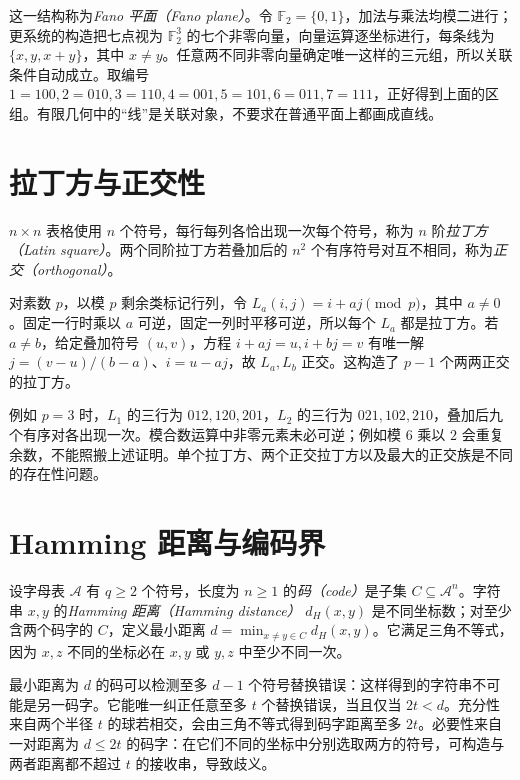 这一结构称为\emph{Fano 平面（Fano plane）}。令 $\mathbb F_2=\{0,1\}$，加法与乘法均模二进行；更系统的构造把七点视为 $\mathbb F_2^3$ 的七个非零向量，向量运算逐坐标进行，每条线为 $\{x,y,x+y\}$，其中 $x\ne y$。任意两不同非零向量确定唯一这样的三元组，所以关联条件自动成立。取编号 $1=100,2=010,3=110,4=001,5=101,6=011,7=111$，正好得到上面的区组。有限几何中的“线”是关联对象，不要求在普通平面上都画成直线。

\section{拉丁方与正交性}

\begin{definition}
$n\times n$ 表格使用 $n$ 个符号，每行每列各恰出现一次每个符号，称为 $n$ 阶\emph{拉丁方（Latin square）}。两个同阶拉丁方若叠加后的 $n^2$ 个有序符号对互不相同，称为\emph{正交（orthogonal）}。
\end{definition}

对素数 $p$，以模 $p$ 剩余类标记行列，令 $L_a(i,j)=i+aj\pmod p$，其中 $a\ne0$。固定一行时乘以 $a$ 可逆，固定一列时平移可逆，所以每个 $L_a$ 都是拉丁方。若 $a\ne b$，给定叠加符号 $(u,v)$，方程 $i+aj=u,i+bj=v$ 有唯一解 $j=(v-u)/(b-a)$、$i=u-aj$，故 $L_a,L_b$ 正交。这构造了 $p-1$ 个两两正交的拉丁方。

例如 $p=3$ 时，$L_1$ 的三行为 $012,120,201$，$L_2$ 的三行为 $021,102,210$，叠加后九个有序对各出现一次。模合数运算中非零元素未必可逆；例如模 $6$ 乘以 $2$ 会重复余数，不能照搬上述证明。单个拉丁方、两个正交拉丁方以及最大的正交族是不同的存在性问题。

\section{Hamming 距离与编码界}

设字母表 $\mathcal A$ 有 $q\ge2$ 个符号，长度为 $n\ge1$ 的\emph{码（code）}是子集 $C\subseteq\mathcal A^n$。字符串 $x,y$ 的\emph{Hamming 距离（Hamming distance）} $d_H(x,y)$ 是不同坐标数；对至少含两个码字的 $C$，定义最小距离 $d=\min_{x\ne y\in C}d_H(x,y)$。它满足三角不等式，因为 $x,z$ 不同的坐标必在 $x,y$ 或 $y,z$ 中至少不同一次。

最小距离为 $d$ 的码可以检测至多 $d-1$ 个符号替换错误：这样得到的字符串不可能是另一码字。它能唯一纠正任意至多 $t$ 个替换错误，当且仅当 $2t<d$。充分性来自两个半径 $t$ 的球若相交，会由三角不等式得到码字距离至多 $2t$。必要性来自一对距离为 $d\le2t$ 的码字：在它们不同的坐标中分别选取两方的符号，可构造与两者距离都不超过 $t$ 的接收串，导致歧义。

